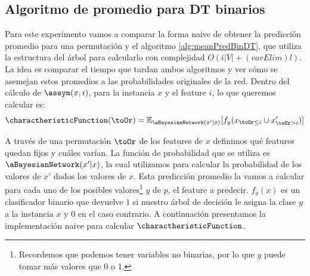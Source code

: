 \subsection{Algoritmo de promedio para DT binarios}
\label{subSection:experimentoAlgoritmoPromedio}
Para este experimento vamos a comparar la forma naive de obtener la predicción promedio para una permutación y el algoritmo \ref{alg:meanPredBinDT}, que utiliza la estructura del árbol para calcularlo con complejidad $O(i|V| + (varElim)l)$. La idea es comparar el tiempo que tardan ambos algoritmos y ver cómo se asemejan estos promedios a las probabilidades originales de la red. Dentro del cálculo de $\assym(x,i)$, para la instancia $x$ y el feature $i$, lo que queremos calcular es:
$$\charactheristicFunction(\toOr) = \mathbb{E}_{\aBayesianNetwork(x' | x)}[f_y(x_{\toOr \leq i} \cup x'_{\toOr > i})]$$


A través de una permutación $\toOr$ de los features de $x$ definimos qué features quedan fijos y cuáles varían. La función de probabilidad que se utiliza es $\aBayesianNetwork(x' | x)$, la cual utilizamos para calcular la probabilidad de los valores de $x'$ dados los valores de $x$. Esta predicción promedio la vamos a calcular para cada uno de los posibles valores\footnote{Recordemos que podemos tener variables no binarias, por lo que $y$ puede tomar más valores que 0 o 1.} $y$ de $p$, el feature a predecir. $f_y(x)$ es un clasificador binario que devuelve $1$ si nuestro árbol de decisión le asigna la clase $y$ a la instancia $x$ y $0$ en el caso contrario. A continuación presentamos la implementación naive para calcular $\charactheristicFunction$. 

